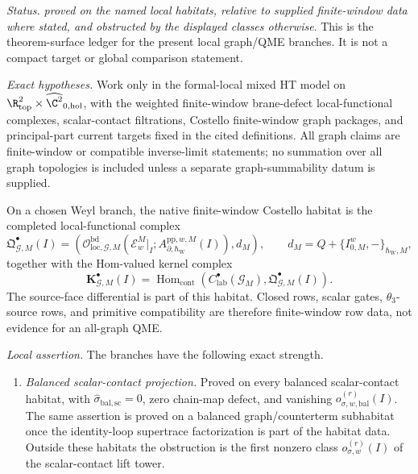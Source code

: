 \begin{stmt}\label{thm:lane-local-graph-qme-branch-catalogue}
  \emph{Status.} \emph{proved on the named local habitats, relative
  to supplied finite-window data where stated, and obstructed by the
  displayed classes otherwise}.  This is the theorem-surface ledger for
  the present local graph/QME branches.  It is not a compact target or
  global comparison statement.

  \emph{Exact hypotheses.} Work only in the formal-local mixed HT model on
  \(\R^2_{\mathrm{top}}\times\widehat{\C^2}_{0,\mathrm{hol}}\), with the
  weighted finite-window brane-defect local-functional complexes,
  scalar-contact filtrations, Costello finite-window graph packages, and
  principal-part current targets fixed in the cited definitions.  All
  graph claims are finite-window or compatible inverse-limit statements;
  no summation over all graph topologies is included unless a separate
  graph-summability datum is supplied.

  On a chosen Weyl branch, the native finite-window Costello habitat is
  the completed local-functional complex
  \[
    \mathfrak Q^\bullet_{\mathcal G,M}(I)
    =
    \left(
    \mathcal O^{\mathrm{bd}}_{\mathrm{loc},\mathcal G,M}
    (\mathcal E_w^M|_I;
     A^{\mathrm{pp},w,M}_{\partial,\hbar_{\mathrm{W}}}(I)),
    d_M
    \right),
    \qquad
    d_M=Q+\{I^w_{0,M},-\}_{\hbar_{\mathrm{W}},M},
  \]
  together with the Hom-valued kernel complex
  \[
    \mathbf K^\bullet_{\mathcal G,M}(I)
    =
    \operatorname{Hom}_{\mathrm{cont}}
    (C^\bullet_{\mathrm{lab}}(\mathcal G_M),
     \mathfrak Q^\bullet_{\mathcal G,M}(I)).
  \]
  The source-face differential is part of this habitat.  Closed rows,
  scalar gates, \(\theta_3\)-source rows, and primitive compatibility are
  therefore finite-window row data, not evidence for an all-graph QME.

  \emph{Local assertion.} The branches have the following exact strength.
  \begin{enumerate}[label=(\arabic*)]
    \item \emph{Balanced scalar-contact projection.}  Proved on every
    balanced scalar-contact habitat, with
    \(\widehat\sigma_{\mathrm{bal,sc}}=0\), zero chain-map defect, and
    vanishing \(o_{\sigma,w,\mathrm{bal}}^{(r)}(I)\).  The same assertion
    is proved on a balanced graph/counterterm subhabitat once the
    identity-loop supertrace factorization is part of the habitat data.
    Outside these habitats the obstruction is the first nonzero class
    \(o_{\sigma,w}^{(r)}(I)\) of the scalar-contact lift tower.


\end{enumerate}
\end{stmt}
